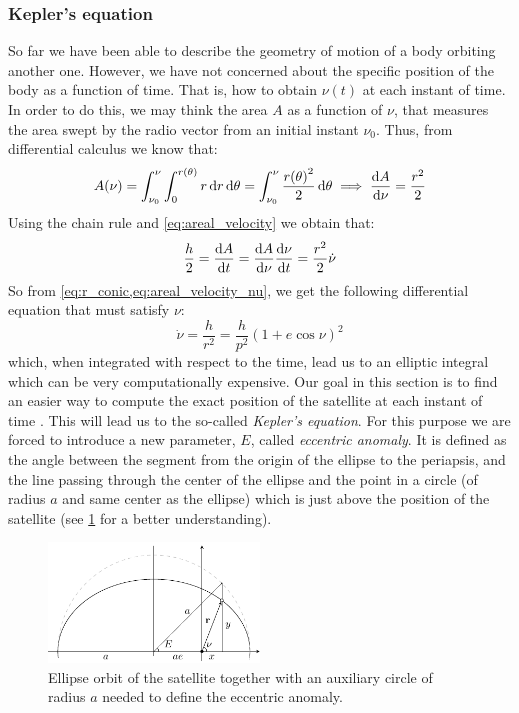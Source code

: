 \documentclass[../main.tex]{subfiles}
\begin{document}
\subsubsection{Kepler's equation}\label{sec:kepler_equation}
So far we have been able to describe the geometry of motion of a body orbiting another one. However, we have not concerned about the specific position of the body as a function of time. That is, how to obtain $\nu(t)$ at each instant of time. In order to do this, we may think the area $A$ as a function of $\nu$, that measures the area swept by the radio vector from an initial instant $\nu_0$. Thus, from differential calculus we know that:
\begin{equation}
  A(\nu)=\int_{\nu_0}^{\nu}\int_{0}^{r(\theta)}r\dd{r}\dd{\theta}=\int_{\nu_0}^{\nu}\frac{{r(\theta)}^2}{2}\dd{\theta}\implies\dv{A}{\nu}=\frac{r^2}{2}
\end{equation}
Using the chain rule and \cref{eq:areal_velocity} we obtain that:
\begin{equation}\label{eq:areal_velocity_nu}
  \frac{h}{2}=\dv{A}{t}=\dv{A}{\nu}\dv{\nu}{t}=\frac{r^2}{2}\dot\nu
\end{equation}
So from \cref{eq:r_conic,eq:areal_velocity_nu}, we get the following differential equation that must satisfy $\nu$:
\begin{equation}
  \dot\nu=\frac{h}{r^2}=\frac{h}{p^2}{(1+e\cos\nu)}^2
\end{equation}
which, when integrated with respect to the time, lead us to an elliptic integral which can be very computationally expensive. Our goal in this section is to find an easier way to compute the exact position of the satellite at each instant of time \cite{montenbruck}. This will lead us to the so-called \emph{Kepler's equation}. For this purpose we are forced to introduce a new parameter, $E$, called \emph{eccentric anomaly}. It is defined as the angle between the segment from the origin of the ellipse to the periapsis, and the line passing through the center of the ellipse and the point in a circle (of radius $a$ and same center as the ellipse) which is just above the position of the satellite (see \cref{fig:kepler_eq} for a better understanding).
\begin{figure}[ht]
  \centering
  \includegraphics[width=0.5\textwidth]{Images/kepler_eq.pdf}
  \caption{Ellipse orbit of the satellite together with an auxiliary circle of radius $a$ needed to define the eccentric anomaly.}
  \label{fig:kepler_eq}
\end{figure}
\end{document}
